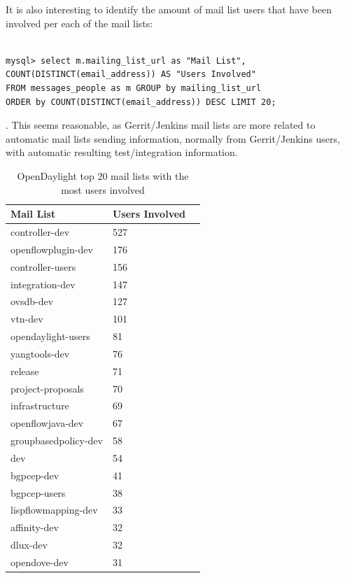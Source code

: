 \documentclass[a4paper, 12pt]{book}
\begin{document}
It is also interesting to identify the amount of mail list users that have been involved per each of the mail lists:

\begin{verbatim}

mysql> select m.mailing_list_url as "Mail List",
COUNT(DISTINCT(email_address)) AS "Users Involved"
FROM messages_people as m GROUP by mailing_list_url
ORDER by COUNT(DISTINCT(email_address)) DESC LIMIT 20;

\end{verbatim}

. This seems reasonable, as Gerrit/Jenkins mail lists are more related to automatic mail lists sending information, normally from Gerrit/Jenkins users, with automatic resulting test/integration information.

\begin{table}[H]
\footnotesize
\begin{center}
\begin{tabular}{|l|l|p{3cm}|}
\hline
\textbf{Mail List} & \textbf{Users Involved} \\ \hline
controller-dev & 527 \\ \hline
openflowplugin-dev & 176 \\ \hline
controller-users & 156 \\ \hline
integration-dev & 147 \\ \hline
ovsdb-dev & 127 \\ \hline
vtn-dev & 101 \\ \hline
opendaylight-users & 81 \\ \hline
yangtools-dev & 76 \\ \hline
release & 71 \\ \hline
project-proposals & 70 \\ \hline
infrastructure & 69 \\ \hline
openflowjava-dev & 67 \\ \hline
groupbasedpolicy-dev & 58 \\ \hline
dev & 54 \\ \hline
bgpcep-dev & 41 \\ \hline
bgpcep-users & 38 \\ \hline
lispflowmapping-dev & 33 \\ \hline
affinity-dev & 32 \\ \hline
dlux-dev & 32 \\ \hline
opendove-dev & 31 \\ \hline
\end{tabular}
\end{center}
\caption{OpenDaylight top 20 mail lists with the most users involved}
\label{tab:odl_top_maillists}
\end{table}
\end{document}
